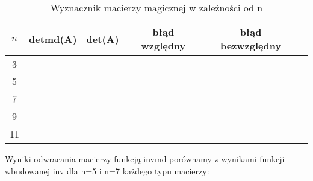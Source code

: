 \documentclass[12pt]{article}
\begin{document}
\begin{table}[h!]
\caption{\footnotesize Wyznacznik macierzy magicznej w zale\.zno\'sci od n}%
\renewcommand{\arraystretch}{1.1}
\centering\begin{tabular}{|c|c|c|c|c|c|}
\hline $n$ & detmd(A) & det(A) & b\l{}\k{a}d wzgl\k{e}dny & b\l{}\k{a}d bezwzgl\k{e}dny\\
\hline 3 &  &  &  &   \\
\hline 5 &  &  &  &    \\
\hline 7 &   &  &  &     \\
\hline 9 &   &  &  &     \\
\hline 11 &   &  &  &    \\
\hline
\end{tabular}
\label{WyznacznikMagic}
\end{table}
\newpage
Wyniki odwracania macierzy funkcj\k{a} invmd por\'ownamy z wynikami funkcji wbudowanej inv dla n=5 i n=7 ka\.zdego typu macierzy:
\end{document}
